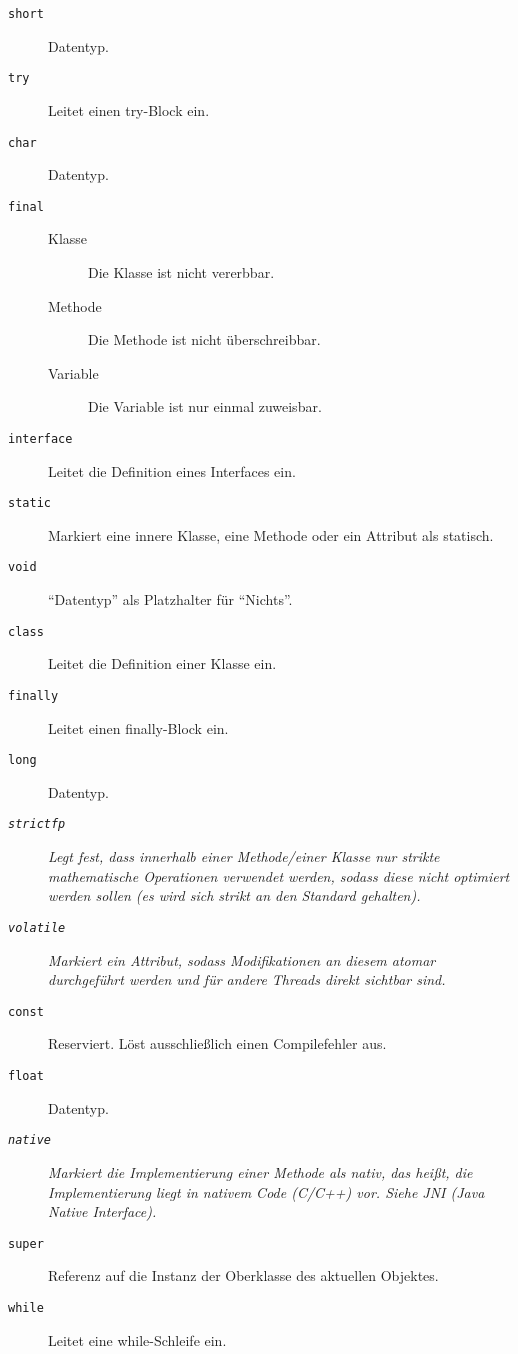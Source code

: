 \begin{description}
        \item[\texttt{short}] Datentyp.
        \item[\texttt{try}] Leitet einen try-Block ein.
        \item[\texttt{char}] Datentyp.
        \item[\texttt{final}]
	        \begin{description}
	        	\item[Klasse] Die Klasse ist nicht vererbbar.
	        	\item[Methode] Die Methode ist nicht überschreibbar.
	        	\item[Variable] Die Variable ist nur einmal zuweisbar.
	        \end{description}
        \item[\texttt{interface}] Leitet die Definition eines Interfaces ein.
        \item[\texttt{static}] Markiert eine innere Klasse, eine Methode oder ein Attribut als statisch.
        \item[\texttt{void}] \enquote{Datentyp} als Platzhalter für \enquote{Nichts}.
        \item[\texttt{class}] Leitet die Definition einer Klasse ein.
        \item[\texttt{finally}] Leitet einen finally-Block ein.
        \item[\texttt{long}] Datentyp.
        \item[\textit{\texttt{strictfp}}] \textit{Legt fest, dass innerhalb einer Methode/einer Klasse nur strikte mathematische Operationen verwendet werden, sodass diese nicht optimiert werden sollen (es wird sich strikt an den Standard gehalten).}
        \item[\textit{\texttt{volatile}}] \textit{Markiert ein Attribut, sodass Modifikationen an diesem atomar durchgeführt werden und für andere Threads direkt sichtbar sind.}
        \item[\texttt{const}] Reserviert. Löst ausschließlich einen Compilefehler aus.
        \item[\texttt{float}] Datentyp.
        \item[\textit{\texttt{native}}] \textit{Markiert die Implementierung einer Methode als nativ, das heißt, die Implementierung liegt in nativem Code (C/C++) vor. Siehe JNI (Java Native Interface).}
        \item[\texttt{super}] Referenz auf die Instanz der Oberklasse des aktuellen Objektes.
        \item[\texttt{while}] Leitet eine while-Schleife ein.
	\end{description}
	
